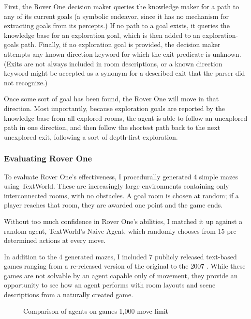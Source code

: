 First, the Rover One decision maker queries the knowledge maker for a
path to any of its current goals (a symbolic endeavor, since it has no
mechanism for extracting goals from its percepts.) If no path to a goal
exists, it queries the knowledge base for an exploration goal, which is
then added to an exploration-goals path. Finally, if no exploration goal
is provided, the decision maker attempts any known direction keyword for
which the exit predicate is unknown. (Exits are not always included in
room descriptions, or a known direction keyword might be accepted as a
synonym for a described exit that the parser did not recognize.)

Once some sort of goal has been found, the Rover One will move in that
direction. Most importantly, because exploration goals are reported by
the knowledge base from all explored rooms, the agent is able to follow
an unexplored path in one direction, and then follow the shortest path
back to the next unexplored exit, following a sort of depth-first
exploration.

\subsubsection{Evaluating Rover One}

To evaluate Rover One's effectiveness, I procedurally generated 4 simple
mazes using TextWorld. These are increasingly large environments
containing only interconnected rooms, with no obstacles. A goal room is
chosen at random; if a player reaches that room, they are awarded one
point and the game ends.

Without too much confidence in Rover One's abilities, I matched it up
against a random agent, TextWorld's Naive Agent, which randomly chooses
from 15 pre-determined actions at every move.

In addition to the 4 generated mazes, I included 7 publicly released
text-based games ranging from a re-released version of the original
 to the 2007 \cite{crowther_adventure_1976, plotkin_hunter_1999, jota_lost_2007,
    gentry_anchorhead_1998, nelson_curses_1993, blank_zork_1980,
cadre_905_2000}. While these games are not solvable by an agent capable
only of movement, they provide an opportunity to see how an agent
performs with room layouts and scene descriptions from a naturally
created game.

\begin{figure}[h]
    \centering

\caption{Comparison of agents on games 1,000 move limit}
\end{figure}


